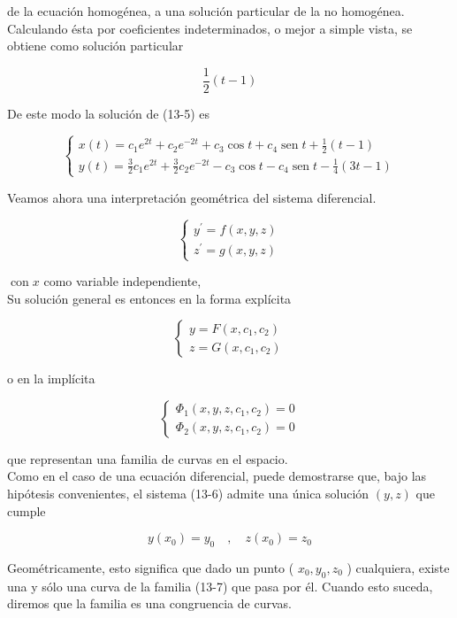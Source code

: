 \documentclass[10pt]{article}
\theoremstyle{plain}
\theoremstyle{definition}
\theoremstyle{remark}
\begin{document}
de la ecuación homogénea, a una solución particular de la no homogénea. Calculando ésta por coeficientes indeterminados, o mejor a simple vista, se obtiene como solución particular

$$
\frac{1}{2}(t-1)
$$

De este modo la solución de (13-5) es

$$
\left\{\begin{array}{l}
x(t)=c_{1} e^{2 t}+c_{2} e^{-2 t}+c_{3} \cos t+c_{4} \operatorname{sen} t+\frac{1}{2}(t-1) \\
y(t)=\frac{3}{2} c_{1} e^{2 t}+\frac{3}{2} c_{2} e^{-2 t}-c_{3} \cos t-c_{4} \operatorname{sen} t-\frac{1}{4}(3 t-1)
\end{array}\right.
$$

Veamos ahora una interpretación geométrica del sistema diferencial.

$$
\left\{\begin{array}{l}
y^{\prime}=f(x, y, z) \\
z^{\prime}=g(x, y, z)
\end{array}\right.
$$

$\operatorname{con} x$ como variable independiente,\\
Su solución general es entonces en la forma explícita

$$
\left\{\begin{array}{l}
y=F\left(x, c_{1}, c_{2}\right) \\
z=G\left(x, c_{1}, c_{2}\right)
\end{array}\right.
$$

o en la implícita

\[
\left\{\begin{array}{l}
\Phi_{1}\left(x, y, z, c_{1}, c_{2}\right)=0  \tag{13-7}\\
\Phi_{2}\left(x, y, z, c_{1}, c_{2}\right)=0
\end{array}\right.
\]

que representan una familia de curvas en el espacio.\\
Como en el caso de una ecuación diferencial, puede demostrarse que, bajo las hipótesis convenientes, el sistema (13-6) admite una única solución $(y, z)$ que cumple

$$
y\left(x_{0}\right)=y_{0} \quad, \quad z\left(x_{0}\right)=z_{0}
$$

Geométricamente, esto significa que dado un punto ( $x_{0}, y_{0}, z_{0}$ ) cualquiera, existe una y sólo una curva de la familia (13-7) que pasa por él. Cuando esto suceda, diremos que la familia es una congruencia de curvas.
\end{document}
